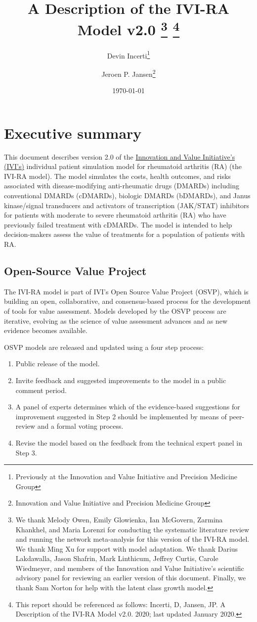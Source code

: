 \documentclass[11pt,final,fleqn]{article}
\title{A Description of the IVI-RA Model v2.0 
\thanks{We thank Melody Owen, Emily Glowienka, Ian McGovern, Zarmina Khankhel, and Maria Lorenzi for conducting the systematic literature review and running the network meta-analysis for this version of the IVI-RA model. We thank Ming Xu for support with model adaptation. We thank Darius Lakdawalla, Jason Shafrin, Mark Linthicum, Jeffrey Curtis, Carole Wiedmeyer, and members of the Innovation and Value Initiative's scientific advisory panel for reviewing an earlier version of this document. Finally, we thank Sam Norton for help with the latent class growth model.} 
\footnote{This report should be referenced as follows: Incerti, D, Jansen, JP. A Description of the IVI-RA Model v2.0. 2020; last updated January 2020.}
}
\author{Devin Incerti\footnote{Previously at the Innovation and Value Initiative and Precision Medicine Group} \and Jeroen P. Jansen\footnote{Innovation and Value Initiative and Precision Medicine Group}}
\date{\today}
\theoremstyle{plain}
\begin{document}

\maketitle

\begingroup
 \hypersetup{linkcolor=black} \tableofcontents
 \listoffigures
 \listoftables
\endgroup


\clearpage
{}
\section*{Executive summary}\label{sec:executive-summary}
This document describes version 2.0 of the \href{http://www.thevalueinitiative.org/}{Innovation and Value Initiative's (IVI's)} individual patient simulation model for rheumatoid arthritis (RA) (the IVI-RA model). The model simulates the costs, health outcomes, and risks associated with disease-modifying anti-rheumatic drugs (DMARDs) including conventional DMARDs (cDMARDs), biologic DMARDs (bDMARDs), and Janus kinase/signal transducers and activators of transcription (JAK/STAT) inhibitors for patients with moderate to severe rheumatoid arthritis (RA) who have previously failed treatment with cDMARDs. The model is intended to help decision-makers assess the value of treatments for a population of patients with RA.

\subsection*{Open-Source Value Project}
The IVI-RA model is part of IVI's Open Source Value Project (OSVP), which is building an open, collaborative, and consensus-based process for the development of tools for value assessment. Models developed by the OSVP process are iterative, evolving as the science of value assessment advances and as new evidence becomes available.

OSVP models are released and updated using a four step process:

\begin{enumerate}
\item Public release of the model.
\item Invite feedback and suggested improvements to the model in a public comment period.
\item A panel of experts determines which of the evidence-based suggestions for improvement suggested in Step 2 should be implemented by means of peer-review and a formal voting process. 
\item Revise the model based on the feedback from the technical expert panel in Step 3. 
\end{enumerate}
\end{document}
